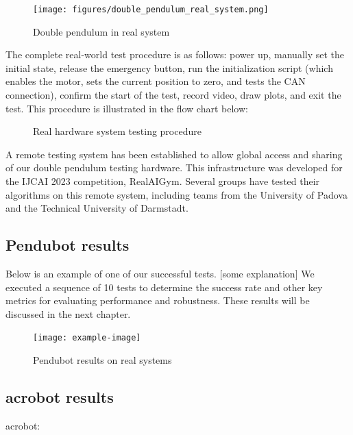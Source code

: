 \begin{figure}[H]
    \centering
    \texttt{[image: figures/double\_pendulum\_real\_system.png]}
    \caption{Double pendulum in real system}
    \label{fig:image_b}
\end{figure}

The complete real-world test procedure is as follows: power up, manually set the initial state, release the emergency button, run the initialization script (which enables the motor, sets the current position to zero, and tests the CAN connection), confirm the start of the test, record video, draw plots, and exit the test. This procedure is illustrated in the flow chart below:

\begin{figure}[H]
    \centering
    \caption{Real hardware system testing procedure}
    \label{fig:image_b}
\end{figure}

A remote testing system has been established to allow global access and sharing of our double pendulum testing hardware. This infrastructure was developed for the IJCAI 2023 competition, RealAIGym. Several groups have tested their algorithms on this remote system, including teams from the University of Padova and the Technical University of Darmstadt.

\subsection{Pendubot results}
Below is an example of one of our successful tests. [some explanation] We executed a sequence of 10 tests to determine the success rate and other key metrics for evaluating performance and robustness. These results will be discussed in the next chapter. 

\begin{figure}[H]
    \centering
    \texttt{[image: example-image]}
    \caption{Pendubot results on real systems}
    \label{fig:my_label}
\end{figure}

\subsection{acrobot results}
acrobot:

\cleardoublepage
